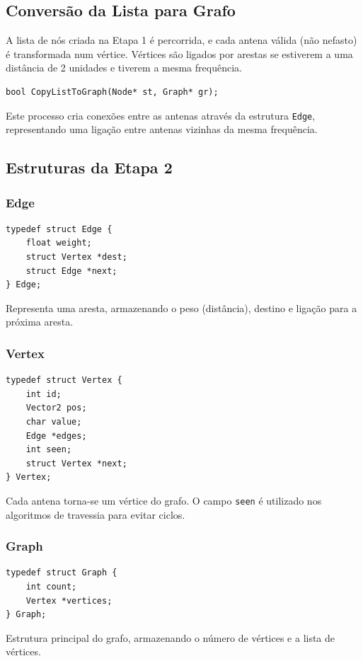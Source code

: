 \documentclass[a4paper,12pt]{article}
\begin{document}
\subsection{Conversão da Lista para Grafo}
A lista de nós criada na Etapa 1 é percorrida, e cada antena válida (não nefasto) é transformada num vértice. Vértices são ligados por arestas se estiverem a uma distância de 2 unidades e tiverem a mesma frequência.

\begin{lstlisting}[style=CStyle]
bool CopyListToGraph(Node* st, Graph* gr);
\end{lstlisting}

Este processo cria conexões entre as antenas através da estrutura \texttt{Edge}, representando uma ligação entre antenas vizinhas da mesma frequência.

\subsection{Estruturas da Etapa 2}
\subsubsection{Edge}
\begin{lstlisting}[style=CStyle]
typedef struct Edge {
    float weight;
    struct Vertex *dest;
    struct Edge *next;
} Edge;
\end{lstlisting}
Representa uma aresta, armazenando o peso (distância), destino e ligação para a próxima aresta.

\subsubsection{Vertex}
\begin{lstlisting}[style=CStyle]
typedef struct Vertex {
    int id;
    Vector2 pos;
    char value;
    Edge *edges;
    int seen;
    struct Vertex *next;
} Vertex;
\end{lstlisting}
Cada antena torna-se um vértice do grafo. O campo \texttt{seen} é utilizado nos algoritmos de travessia para evitar ciclos.

\subsubsection{Graph}
\begin{lstlisting}[style=CStyle]
typedef struct Graph {
    int count;
    Vertex *vertices;
} Graph;
\end{lstlisting}
Estrutura principal do grafo, armazenando o número de vértices e a lista de vértices.
\end{document}
